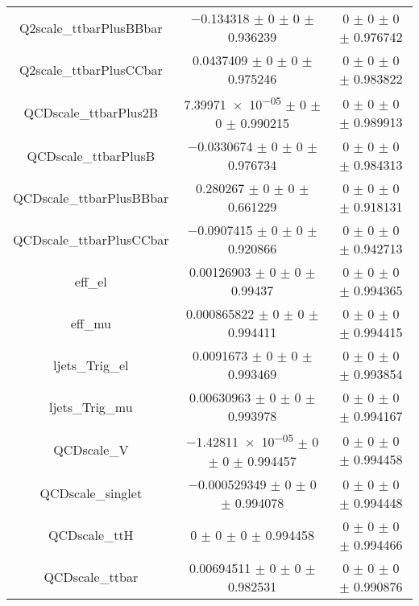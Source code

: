 \begin{table}
\begin{tabular}{ccc}
Q2scale\_ttbarPlusBBbar & \num{-0.134318} $\pm$ \num{0} $\pm$ \num{0} $\pm$ \num{0.936239} & \num{0} $\pm$ \num{0} $\pm$ \num{0} $\pm$ \num{0.976742}\\
Q2scale\_ttbarPlusCCbar & \num{0.0437409} $\pm$ \num{0} $\pm$ \num{0} $\pm$ \num{0.975246} & \num{0} $\pm$ \num{0} $\pm$ \num{0} $\pm$ \num{0.983822}\\
QCDscale\_ttbarPlus2B & \num{7.39971e-05} $\pm$ \num{0} $\pm$ \num{0} $\pm$ \num{0.990215} & \num{0} $\pm$ \num{0} $\pm$ \num{0} $\pm$ \num{0.989913}\\
QCDscale\_ttbarPlusB & \num{-0.0330674} $\pm$ \num{0} $\pm$ \num{0} $\pm$ \num{0.976734} & \num{0} $\pm$ \num{0} $\pm$ \num{0} $\pm$ \num{0.984313}\\
QCDscale\_ttbarPlusBBbar & \num{0.280267} $\pm$ \num{0} $\pm$ \num{0} $\pm$ \num{0.661229} & \num{0} $\pm$ \num{0} $\pm$ \num{0} $\pm$ \num{0.918131}\\
QCDscale\_ttbarPlusCCbar & \num{-0.0907415} $\pm$ \num{0} $\pm$ \num{0} $\pm$ \num{0.920866} & \num{0} $\pm$ \num{0} $\pm$ \num{0} $\pm$ \num{0.942713}\\
eff\_el & \num{0.00126903} $\pm$ \num{0} $\pm$ \num{0} $\pm$ \num{0.99437} & \num{0} $\pm$ \num{0} $\pm$ \num{0} $\pm$ \num{0.994365}\\
eff\_mu & \num{0.000865822} $\pm$ \num{0} $\pm$ \num{0} $\pm$ \num{0.994411} & \num{0} $\pm$ \num{0} $\pm$ \num{0} $\pm$ \num{0.994415}\\
ljets\_Trig\_el & \num{0.0091673} $\pm$ \num{0} $\pm$ \num{0} $\pm$ \num{0.993469} & \num{0} $\pm$ \num{0} $\pm$ \num{0} $\pm$ \num{0.993854}\\
ljets\_Trig\_mu & \num{0.00630963} $\pm$ \num{0} $\pm$ \num{0} $\pm$ \num{0.993978} & \num{0} $\pm$ \num{0} $\pm$ \num{0} $\pm$ \num{0.994167}\\
QCDscale\_V & \num{-1.42811e-05} $\pm$ \num{0} $\pm$ \num{0} $\pm$ \num{0.994457} & \num{0} $\pm$ \num{0} $\pm$ \num{0} $\pm$ \num{0.994458}\\
QCDscale\_singlet & \num{-0.000529349} $\pm$ \num{0} $\pm$ \num{0} $\pm$ \num{0.994078} & \num{0} $\pm$ \num{0} $\pm$ \num{0} $\pm$ \num{0.994448}\\
QCDscale\_ttH & \num{0} $\pm$ \num{0} $\pm$ \num{0} $\pm$ \num{0.994458} & \num{0} $\pm$ \num{0} $\pm$ \num{0} $\pm$ \num{0.994466}\\
QCDscale\_ttbar & \num{0.00694511} $\pm$ \num{0} $\pm$ \num{0} $\pm$ \num{0.982531} & \num{0} $\pm$ \num{0} $\pm$ \num{0} $\pm$ \num{0.990876}\\

\end{tabular}
\end{table}
